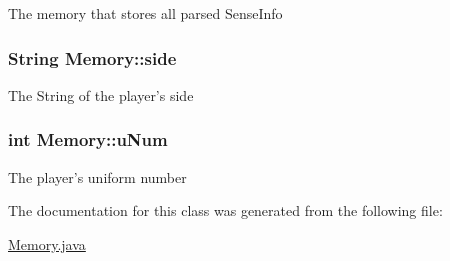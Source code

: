 \label{classMemory_a5a5e28abf688e0a18930e5dbdbc807b2}
The memory that stores all parsed SenseInfo \hypertarget{classMemory_ac56cee169ca4e880744065f25f306b82}{
\subsubsection[{side}]{\setlength{\rightskip}{0pt plus 5cm}String {\bf Memory::side}}}
\label{classMemory_ac56cee169ca4e880744065f25f306b82}
The String of the player's side \hypertarget{classMemory_a62572ea10a84193a66c33ecd43c252f7}{
\subsubsection[{uNum}]{\setlength{\rightskip}{0pt plus 5cm}int {\bf Memory::uNum}}}
\label{classMemory_a62572ea10a84193a66c33ecd43c252f7}
The player's uniform number 

The documentation for this class was generated from the following file:\begin{DoxyCompactItemize}
\item 
\hyperlink{Memory_8java}{Memory.java}\end{DoxyCompactItemize}
